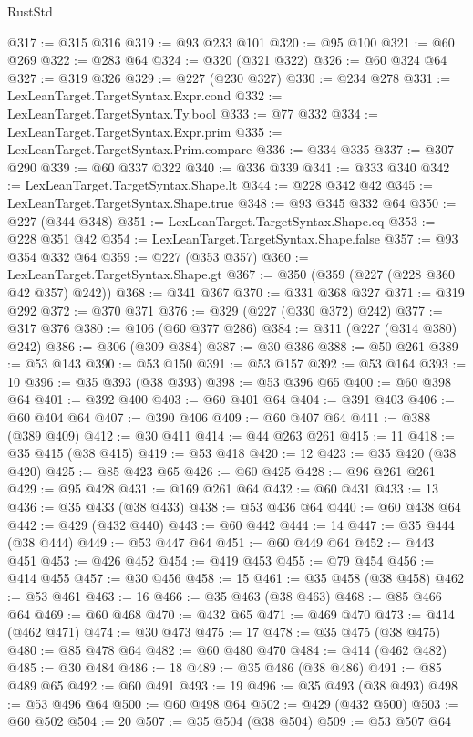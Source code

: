 \begin{lexlean}{RustStd}
\begin{coremodule}
@317 := @315 @316
@319 := @93 @233 @101
@320 := @95 @100
@321 := @60 @269
@322 := @283 @64
@324 := @320 (@321 @322)
@326 := @60 @324 @64
@327 := @319 @326
@329 := @227 (@230 @327)
@330 := @234 @278
@331 := LexLeanTarget.TargetSyntax.Expr.cond
@332 := LexLeanTarget.TargetSyntax.Ty.bool
@333 := @77 @332
@334 := LexLeanTarget.TargetSyntax.Expr.prim
@335 := LexLeanTarget.TargetSyntax.Prim.compare
@336 := @334 @335
@337 := @307 @290
@339 := @60 @337 @322
@340 := @336 @339
@341 := @333 @340
@342 := LexLeanTarget.TargetSyntax.Shape.lt
@344 := @228 @342 @42
@345 := LexLeanTarget.TargetSyntax.Shape.true
@348 := @93 @345 @332 @64
@350 := @227 (@344 @348)
@351 := LexLeanTarget.TargetSyntax.Shape.eq
@353 := @228 @351 @42
@354 := LexLeanTarget.TargetSyntax.Shape.false
@357 := @93 @354 @332 @64
@359 := @227 (@353 @357)
@360 := LexLeanTarget.TargetSyntax.Shape.gt
@367 := @350 (@359 (@227 (@228 @360 @42 @357) @242))
@368 := @341 @367
@370 := @331 @368 @327
@371 := @319 @292
@372 := @370 @371
@376 := @329 (@227 (@330 @372) @242)
@377 := @317 @376
@380 := @106 (@60 @377 @286)
@384 := @311 (@227 (@314 @380) @242)
@386 := @306 (@309 @384)
@387 := @30 @386
@388 := @50 @261
@389 := @53 @143
@390 := @53 @150
@391 := @53 @157
@392 := @53 @164
@393 := 10
@396 := @35 @393 (@38 @393)
@398 := @53 @396 @65
@400 := @60 @398 @64
@401 := @392 @400
@403 := @60 @401 @64
@404 := @391 @403
@406 := @60 @404 @64
@407 := @390 @406
@409 := @60 @407 @64
@411 := @388 (@389 @409)
@412 := @30 @411
@414 := @44 @263 @261
@415 := 11
@418 := @35 @415 (@38 @415)
@419 := @53 @418
@420 := 12
@423 := @35 @420 (@38 @420)
@425 := @85 @423 @65
@426 := @60 @425
@428 := @96 @261 @261
@429 := @95 @428
@431 := @169 @261 @64
@432 := @60 @431
@433 := 13
@436 := @35 @433 (@38 @433)
@438 := @53 @436 @64
@440 := @60 @438 @64
@442 := @429 (@432 @440)
@443 := @60 @442
@444 := 14
@447 := @35 @444 (@38 @444)
@449 := @53 @447 @64
@451 := @60 @449 @64
@452 := @443 @451
@453 := @426 @452
@454 := @419 @453
@455 := @79 @454
@456 := @414 @455
@457 := @30 @456
@458 := 15
@461 := @35 @458 (@38 @458)
@462 := @53 @461
@463 := 16
@466 := @35 @463 (@38 @463)
@468 := @85 @466 @64
@469 := @60 @468
@470 := @432 @65
@471 := @469 @470
@473 := @414 (@462 @471)
@474 := @30 @473
@475 := 17
@478 := @35 @475 (@38 @475)
@480 := @85 @478 @64
@482 := @60 @480 @470
@484 := @414 (@462 @482)
@485 := @30 @484
@486 := 18
@489 := @35 @486 (@38 @486)
@491 := @85 @489 @65
@492 := @60 @491
@493 := 19
@496 := @35 @493 (@38 @493)
@498 := @53 @496 @64
@500 := @60 @498 @64
@502 := @429 (@432 @500)
@503 := @60 @502
@504 := 20
@507 := @35 @504 (@38 @504)
@509 := @53 @507 @64

\end{coremodule}
\end{lexlean}
